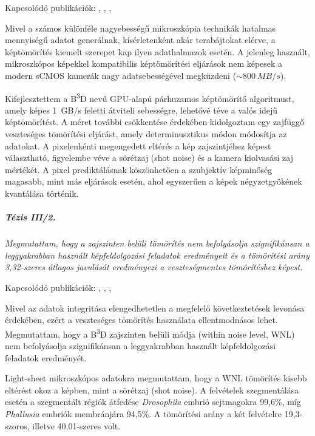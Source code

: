\documentclass{booklet_style}
\def\b3d{B\textsuperscript{3}D}
\begin{document}
    Kapcsolódó publikációk: \cite{balazs_real-time_2017}, \cite{balazs_gpu-based_2016}, \cite{balazs_gpu-based_2016-1}, \cite{balazs_gpu-based_2017}
    
    Mivel a számos különféle nagyebességű mikroszkópia technikák hatalmas mennyiségű adatot generálnak, kísérletenként akár terabájtokat elérve, a képtömörítés kiemelt szerepet kap ilyen adathalmazok esetén. A jelenleg használt, mikroszkópos képekkel kompatibilis képtömörítési eljárások nem képesek a modern sCMOS kamerák nagy adatsebességével megküzdeni ($\sim \SI{800}{MB/s}$).

    Kifejlesztettem a \b3d nevű GPU-alapú párhuzamos képtömörítő algoritmust, amely képes \SI{1}{GB/s} feletti átviteli sebességre, lehetővé téve a valós idejű képtömörítést. A méret további csökkentése érdekében kidolgoztam egy zajfüggő veszteséges tömörítési eljárást, amely determinusztikus módon módosítja az adatokat. A pixelenkénti megengedett eltérés a kép zajszintjéhez képest választható, figyelembe véve a sörétzaj (shot noise) és a kamera kiolvasási zaj mértékét. A pixel prediktálásnak köszönhetően a szubjektív képminőség magasabb, mint más eljárások esetén, ahol egyszerűen a képek négyzetgyökének kvantálása történik.
  


  \subparagraph{Tézis III/2.} \textit{Megmutattam, hogy a zajszinten belüli tömörítés nem befolyásolja szignifikánsan a leggyakrabban használt képfeldolgozási feladatok eredményeit és a tömörítési arány 3,32-szeres átlagos javulását eredményezi a veszteségmentes tömörítéshez képest.}
  
    Kapcsolódó publikációk: \cite{balazs_real-time_2017}, \cite{balazs_gpu-based_2016}, \cite{balazs_gpu-based_2016-1}, \cite{balazs_gpu-based_2017}
    
    Mivel az adatok integritása elengedhetetlen a megfelelő következtetések levonása érdekében, ezért a veszteséges tömörítés használata ellentmodnásos lehet.
    Megmutattam, hogy a \b3d zajszinten belüli módja (within noise level, WNL) nem befolyásolja szignifikánsan a leggyakrabban használt képfeldolgozási feladatok eredményét.
    
    Light-sheet mikroszkópos adatokra megmutattam, hogy a WNL tömörítés kisebb eltérést okoz a képben, mint a sörétzaj (shot noise). A felvételek szegmentálása esetén a szegmentált régiók átfedése \textit{Drosophila} embrió sejtmagokra 99,6\%, míg \textit{Phallusia} embriók membránjára 94,5\%. A tömörítési arány a két felvételre 19,3-szoros, illetve 40,01-szeres volt.
    
\end{document}
